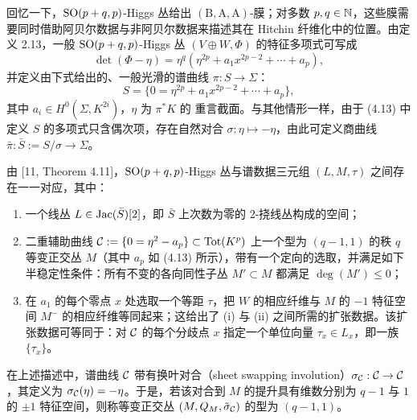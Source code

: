  回忆一下，$\mathrm{SO}(p+q,p)$-Higgs 丛给出 $(\mathrm{B},\mathrm{A},\mathrm{A})$-膜；对多数 $p, q \in \mathbb{N}$，这些膜需要同时借助阿贝尔数据与非阿贝尔数据来描述其在 Hitchin 纤维化中的位置。由定义 2.13，一般 $\mathrm{SO}(p+q,p)$-Higgs 丛 $(V\oplus W,\Phi)$ 的特征多项式可写成
\[
    \det(\Phi-\eta) = \eta^q(\eta^{2p} + a_1x^{2p-2} + \cdots + a_p),
\]
并定义由下式给出的、一般光滑的谱曲线 $\pi : S \to \Sigma$：
\begin{equation}
    S = \{0 = \eta^{2p} + a_1x^{2p-2} + \cdots + a_p\}, \tag{4.13}
\end{equation}
其中 $a_i \in H^0(\Sigma, K^{2i})$，$\eta$ 为 $\pi^*K$ 的 重言截面。与其他情形一样，由于 (4.13) 中定义 $S$ 的多项式只含偶次项，存在自然对合 $\sigma : \eta \mapsto -\eta$，由此可定义商曲线 $\bar\pi : \bar S := S/\sigma \to \Sigma$。

由 [11, Theorem 4.11]，$\mathrm{SO}(p+q,p)$-Higgs 丛与谱数据三元组 $(L,M,\tau)$ 之间存在一一对应，其中：
\begin{enumerate}[label=(\roman*),leftmargin=2.2em]
\item 一个线丛 $L \in \operatorname{Jac}(\bar S)[2]$，即 $\bar S$ 上次数为零的 2-挠线丛构成的空间；
\item 二重辅助曲线 $\mathcal{C} := \{0 = \eta^2 - a_p\} \subset \operatorname{Tot}(K^p)$ 上一个型为 $(q-1,1)$ 的秩 $q$ 等变正交丛 $M$（其中 $a_p$ 如 (4.13) 所示），带有一个定向的选取，并满足如下半稳定性条件：所有不变的各向同性子丛 $M' \subset M$ 都满足 $\deg(M') \leqslant 0$；
\item 在 $a_1$ 的每个零点 $x$ 处选取一个等距 $\tau$，把 $W$ 的相应纤维与 $M$ 的 $-1$ 特征空间 $M^-$ 的相应纤维等同起来；这给出了 (i) 与 (ii) 之间所需的扩张数据。该扩张数据可等同于：对 $\mathcal{C}$ 的每个分歧点 $x$ 指定一个单位向量 $\tau_x \in L_x$，即一族 $\{\tau_x\}$。
\end{enumerate}

在上述描述中，谱曲线 $\mathcal{C}$ 带有换叶对合（sheet swapping involution）$\sigma_{\mathcal{C}} : \mathcal{C} \to \mathcal{C}$，其定义为 $\sigma_{\mathcal{C}}(\eta) = -\eta$。于是，若该对合到 $M$ 的提升具有维数分别为 $q-1$ 与 $1$ 的 $\pm1$ 特征空间，则称等变正交丛 $(M,Q_M,\tilde\sigma_{\mathcal{C}})$ 的型为 $(q-1,1)$。
